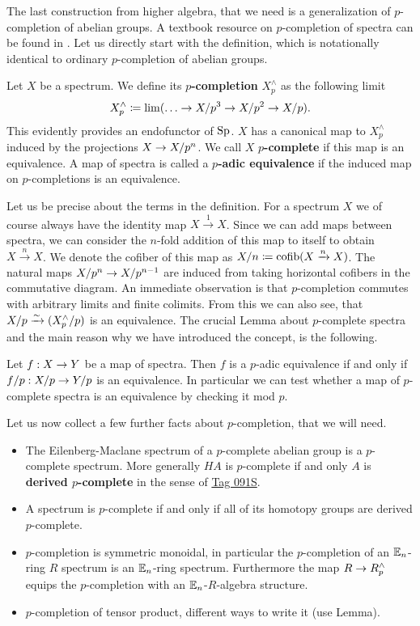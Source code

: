 The last construction from higher algebra, that we need is a generalization of $p$-completion of abelian groups. A textbook resource on $p$-completion of spectra can be found in \cite[Section~8.4.1]{barnesroitzheimfoundation}.
Let us directly start with the definition, which is notationally identical to ordinary $p$-completion of abelian groups.
\begin{defn}
    Let $X$ be a spectrum. We define its \textbf{$p$-completion} $X^\wedge_p$ as the following limit
    \begin{equation*}
        X^\wedge_p\coloneqq \lim (\dots\ra X/p^3\ra X/p^2\ra X/p).
    \end{equation*}
    This evidently provides an endofunctor of $\operatorname{Sp}$.
    $X$ has a canonical map to $X^\wedge_p$ induced by the projections $X\rightarrow X/p^n$. We call $X$ \textbf{$p$-complete} if this map is an equivalence. A map of spectra is called a \textbf{$p$-adic equivalence} if the induced map on $p$-completions is an equivalence.  
\end{defn}
Let us be precise about the terms in the definition. For a spectrum $X$ we of course always have the identity map $X\xrightarrow{1}X$. Since we can add maps between spectra, we can consider the $n$-fold addition of this map to itself to obtain $X\xrightarrow{n}X$. We denote the cofiber of this map as $X/n\coloneqq \operatorname{cofib}(X\xrightarrow{n}X)$. The natural maps $X/p^n\rightarrow X/p^{n-1}$ are induced from taking horizontal cofibers in the commutative diagram.
An immediate observation is that $p$-completion commutes with arbitrary limits and finite colimits. From this we can also see, that $X/p\xrightarrow{\sim} (X_p^{\wedge}/p)$ is an equivalence. The crucial Lemma about $p$-complete spectra and the main reason why we have introduced the concept, is the following.
\begin{lem}
    Let $f:X\rightarrow Y$ be a map of spectra. Then $f$ is a $p$-adic equivalence if and only if $f/p:X/p\rightarrow Y/p$ is an equivalence. In particular we can test whether a map of $p$-complete spectra is an equivalence by checking it mod $p$. 
\end{lem}
Let us now collect a few further facts about $p$-completion, that we will need.
\begin{itemize}
    \item The Eilenberg-Maclane spectrum of a $p$-complete abelian group is a $p$-complete spectrum. More generally $HA$ is $p$-complete if and only $A$ is \textbf{derived $p$-complete} in the sense of \href{https://stacks.math.columbia.edu/tag/091S}{Tag 091S}.
    \item A spectrum is $p$-complete if and only if all of its homotopy groups are derived $p$-complete.
    \item $p$-completion is symmetric monoidal, in particular the $p$-completion of an $\mathbb{E}_n$-ring $R$ spectrum is an $\mathbb{E}_n$-ring spectrum. Furthermore the map $R\rightarrow R_p^{\wedge}$ equips the $p$-completion with an $\mathbb{E}_n$-$R$-algebra structure.
    \item $p$-completion of tensor product, different ways to write it (use Lemma).
\end{itemize}
